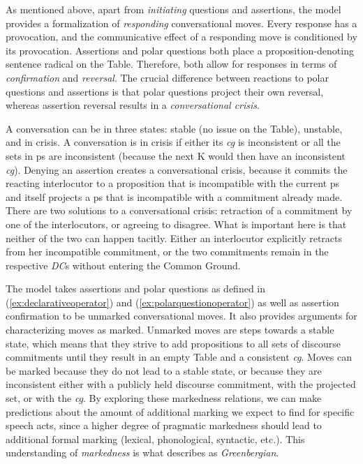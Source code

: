 As mentioned above, apart from \textit{initiating} questions and assertions, the model
provides a formalization of \textit{responding} conversational moves. Every response has a provocation, and the communicative effect of a responding move is conditioned by its provocation. Assertions and polar questions both place a proposition-de\-no\-ting sentence 
radical on the Table. Therefore, both allow for responses in terms of 
\textit{confirmation} and \textit{reversal}. The crucial difference 
between reactions to polar questions and assertions is that polar 
questions project their own reversal, whereas assertion reversal results in a \textit{conversational crisis}.

A conversation can be in three states: stable (no issue on the Table), 
unstable, and in crisis. A conversation is in crisis if either its 
\textit{cg} is inconsistent or all the sets in \ac{ps} are inconsistent 
(because the next \ac{K} would then have an inconsistent \textit{cg}). 
Denying an assertion creates a conversational crisis, because it 
commits the reacting interlocutor to a proposition that is incompatible 
with the current \ac{ps} and itself projects a \ac{ps} that is 
incompatible with a commitment already made. There are two solutions to a 
conversational crisis: retraction of a commitment by one of the 
interlocutors, or agreeing to disagree. What is important here is that 
neither of the two can happen tacitly. Either an interlocutor explicitly 
retracts from her incompatible commitment, or the two commitments remain 
in the respective \textit{DC}s without entering the Common Ground.

The \citeauthor{FarkasBruce.2010} model takes assertions and polar questions as defined in 
(\ref{ex:declarativeoperator}) and (\ref{ex:polarquestionoperator}) as well 
as assertion confirmation to be unmarked conversational moves. It also 
provides arguments for characterizing moves as marked. Un\-mar\-ked moves are 
steps towards a stable state, which means that they strive to add 
propositions to all sets of discourse commitments until they result in an empty Table and a 
consistent \textit{cg}. Moves can be marked because they 
do not lead to a stable state, or because they are inconsistent either with a publicly held discourse commitment, with the projected set, or with the \textit{cg}. By exploring these markedness relations, we can make predictions about the amount of additional marking we expect to find for specific speech acts, since a higher degree of pragmatic markedness should lead to additional formal marking (lexical, phonological, syntactic, etc.). This understanding of \textit{markedness} is what \citet{Haspelmath.2006againstmarkedness} describes as \textit{Greenbergian}. 

